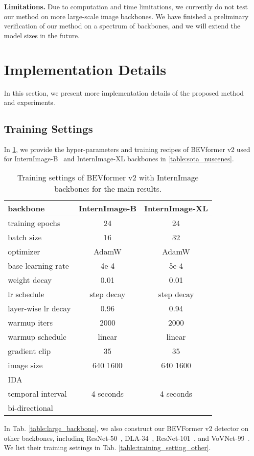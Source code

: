 \documentclass[10pt,twocolumn,letterpaper]{article}
\begin{document}
\noindent\textbf{Limitations.} Due to computation and time limitations, we currently do not test our method on more large-scale image backbones. We have finished a preliminary verification of our method on a spectrum of backbones, and we will extend the model sizes in the future. 
{\small


}

\appendix
\clearpage
\section{Implementation Details}
In this section, we present more implementation details of the proposed method and experiments.

\subsection{Training Settings}
 In \cref{table:training_setting_main}, we provide the hyper-parameters and training recipes of BEVformer v2 used for InternImage-B~\cite{InternImage} and InternImage-XL backbones in \cref{table:sota_nuscenes}.

\let\ck\checkmark

\setlength{\tabcolsep}{5pt}
\setlength{\doublerulesep}{2\arrayrulewidth}
\renewcommand{\arraystretch}{1.0}
\begin{table}[ht]
    \caption{Training settings of BEVformer v2 with InternImage backbones for the main results.}
    \label{table:training_setting_main}
    \centering
    \begin{tabular}{l|cc}
backbone & InternImage-B & InternImage-XL \\
        \hline
        training epochs & 24 & 24 \\
        batch size & 16 & 32 \\
        optimizer & AdamW & AdamW \\
        base learning rate & 4e-4 & 5e-4 \\
        weight decay & 0.01 & 0.01 \\
        lr schedule & step decay & step decay\\
        layer-wise lr decay & 0.96 & 0.94 \\
        warmup iters & 2000 & 2000  \\
        warmup schedule & linear & linear \\
        gradient clip & 35 & 35 \\
        \hline
        image size & 640  1600 & 640  1600 \\
        IDA & \ck & \ck \\
        temporal interval & 4 seconds & 4 seconds \\
        bi-directional & \ck & \ck \\
        \hline
    \end{tabular}
    
\end{table} 
In Tab. \ref{table:large_backbone}, we also construct our BEVFormer v2 detector on other backbones, including ResNet-50~\cite{ResNet}, DLA-34~\cite{DLA}, ResNet-101~\cite{ResNet}, and VoVNet-99~\cite{Vovnet}. We list their training settings in Tab. \ref{table:training_setting_other}.
\end{document}
